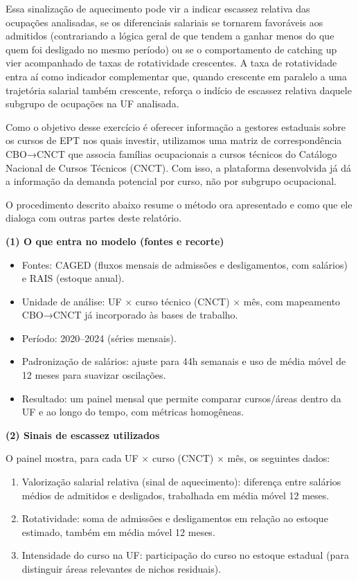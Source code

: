 Essa sinalização de aquecimento pode vir a indicar escassez relativa das ocupações analisadas, se os diferenciais salariais se tornarem favoráveis aos admitidos (contrariando a lógica geral de que tendem a ganhar menos do que quem foi desligado no mesmo período) ou se o comportamento de catching up vier acompanhado de taxas de rotatividade crescentes. A taxa de rotatividade entra aí como indicador complementar que, quando crescente em paralelo a uma trajetória salarial também crescente, reforça o indício de escassez relativa daquele subgrupo de ocupações na UF analisada. 

Como o objetivo desse exercício é oferecer informação a gestores estaduais sobre os cursos de EPT nos quais investir, utilizamos uma matriz de correspondência CBO→CNCT que associa famílias ocupacionais a cursos técnicos do Catálogo Nacional de Cursos Técnicos (CNCT). Com isso, a plataforma desenvolvida já dá a informação da demanda potencial por curso, não por subgrupo ocupacional.

O procedimento descrito abaixo resume o método ora apresentado e como que ele dialoga com outras partes deste relatório.

\textbf{(1) O que entra no modelo (fontes e recorte)}

\begin{itemize}
	\item Fontes: CAGED (fluxos mensais de admissões e desligamentos, com salários) e RAIS (estoque anual).
	\item Unidade de análise: UF × curso técnico (CNCT) × mês, com mapeamento CBO→CNCT já incorporado às bases de trabalho.
	\item Período: 2020–2024 (séries mensais).
	\item Padronização de salários: ajuste para 44h semanais e uso de média móvel de 12 meses para suavizar oscilações.
	\item Resultado: um painel mensal que permite comparar cursos/áreas dentro da UF e ao longo do tempo, com métricas homogêneas.
\end{itemize}

\textbf{(2) Sinais de escassez utilizados}

O painel mostra, para cada UF × curso (CNCT) × mês, os seguintes dados:

\begin{enumerate}
	\item Valorização salarial relativa (sinal de aquecimento): diferença entre salários médios de admitidos e desligados, trabalhada em média móvel 12 meses.
	\item Rotatividade: soma de admissões e desligamentos em relação ao estoque estimado, também em média móvel 12 meses.
	\item Intensidade do curso na UF: participação do curso no estoque estadual (para distinguir áreas relevantes de nichos residuais).
\end{enumerate}

